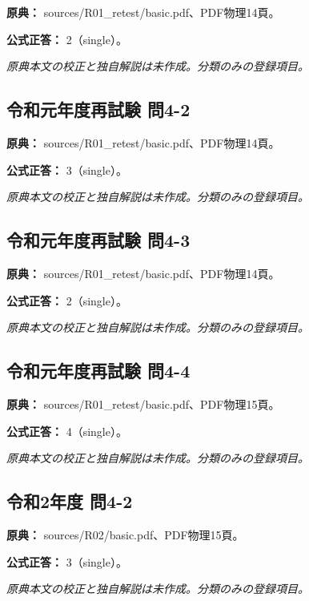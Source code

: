 \noindent\textbf{原典：} sources/R01\_retest/basic.pdf、PDF物理14頁。

\textbf{公式正答：} 2（single）。

\par\textit{原典本文の校正と独自解説は未作成。分類のみの登録項目。}

\subsection{令和元年度再試験 問4-2}
\label{q:r01-ret-basic-4-2}

\noindent\textbf{原典：} sources/R01\_retest/basic.pdf、PDF物理14頁。

\textbf{公式正答：} 3（single）。

\par\textit{原典本文の校正と独自解説は未作成。分類のみの登録項目。}

\subsection{令和元年度再試験 問4-3}
\label{q:r01-ret-basic-4-3}

\noindent\textbf{原典：} sources/R01\_retest/basic.pdf、PDF物理14頁。

\textbf{公式正答：} 2（single）。

\par\textit{原典本文の校正と独自解説は未作成。分類のみの登録項目。}

\subsection{令和元年度再試験 問4-4}
\label{q:r01-ret-basic-4-4}

\noindent\textbf{原典：} sources/R01\_retest/basic.pdf、PDF物理15頁。

\textbf{公式正答：} 4（single）。

\par\textit{原典本文の校正と独自解説は未作成。分類のみの登録項目。}

\subsection{令和2年度 問4-2}
\label{q:r02-reg-basic-4-2}

\noindent\textbf{原典：} sources/R02/basic.pdf、PDF物理15頁。

\textbf{公式正答：} 3（single）。

\par\textit{原典本文の校正と独自解説は未作成。分類のみの登録項目。}

